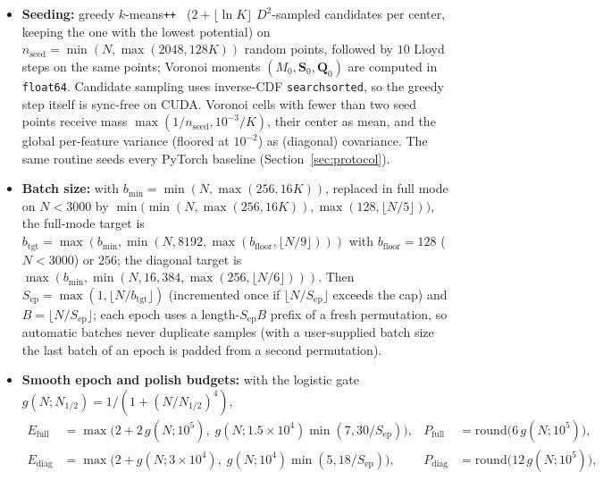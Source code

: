 \documentclass[10pt]{article} %
\begin{document}
\begin{itemize}[leftmargin=*,nosep]
  \item \textbf{Seeding:} greedy $k$-means\texttt{++}~\citep{arthur2007kmeanspp,grunau2023greedy} ($2 + \lfloor \ln K \rfloor$ $D^2$-sampled candidates per center, keeping the one with the lowest potential) on $n_{\mathrm{seed}} = \min(N, \max(2048, 128K))$ random points, followed by $10$ Lloyd steps on the same points; Voronoi moments $(M_0, \mathbf{S}_0, \mathbf{Q}_0)$ are computed in \texttt{float64}. Candidate sampling uses inverse-CDF \texttt{searchsorted}, so the greedy step itself is sync-free on CUDA. Voronoi cells with fewer than two seed points receive mass $\max(1/n_{\mathrm{seed}}, 10^{-3}/K)$, their center as mean, and the global per-feature variance (floored at $10^{-2}$) as (diagonal) covariance. The same routine seeds every PyTorch baseline (Section~\ref{sec:protocol}).
  \item \textbf{Batch size:} with $b_{\min} = \min(N, \max(256, 16K))$, replaced in full mode on $N < 3000$ by $\min\bigl(\min(N, \max(256, 16K)), \max(128, \lfloor N/5 \rfloor)\bigr)$, the full-mode target is $b_{\mathrm{tgt}} = \max(b_{\min}, \min(N, 8192, \max(b_{\mathrm{floor}}, \lfloor N/9 \rfloor)))$ with $b_{\mathrm{floor}} = 128$ ($N < 3000$) or $256$; the diagonal target is $\max(b_{\min}, \min(N, 16{,}384, \max(256, \lfloor N/6 \rfloor)))$. Then $S_{\mathrm{ep}} = \max(1, \lfloor N / b_{\mathrm{tgt}} \rfloor)$ (incremented once if $\lfloor N / S_{\mathrm{ep}} \rfloor$ exceeds the cap) and $B = \lfloor N / S_{\mathrm{ep}} \rfloor$; each epoch uses a length-$S_{\mathrm{ep}}B$ prefix of a fresh permutation, so automatic batches never duplicate samples (with a user-supplied batch size the last batch of an epoch is padded from a second permutation).
  \item \textbf{Smooth epoch and polish budgets:} with the logistic gate $g(N; N_{1/2}) = 1/(1 + (N/N_{1/2})^4)$,
  \begin{align}
  E_{\mathrm{full}} &= \max\!\bigl(2 + 2\,g(N; 10^5),\; g(N; 1.5{\times}10^4)\min(7, 30/S_{\mathrm{ep}})\bigr), & P_{\mathrm{full}} &= \mathrm{round}\bigl(6\, g(N; 10^5)\bigr), \label{eq:epochs_full}\\
  E_{\mathrm{diag}} &= \max\!\bigl(2 + g(N; 3{\times}10^4),\; g(N; 10^4)\min(5, 18/S_{\mathrm{ep}})\bigr), & P_{\mathrm{diag}} &= \mathrm{round}\bigl(12\, g(N; 10^5)\bigr), \label{eq:epochs_diag}
  \end{align}

\end{itemize}
\end{document}
